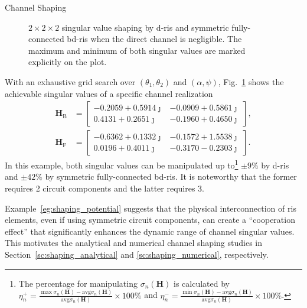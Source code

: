 \documentclass[journal]{IEEEtran}
\begin{document}
\begin{section}{Channel Shaping}
\begin{example}
\begin{figure}
			\caption{$2 \times 2 \times 2$ singular value shaping by \gls{d}-\gls{ris} and symmetric fully-connected \gls{bd}-\gls{ris} when the direct channel is negligible.
			The maximum and minimum of both singular values are marked explicitly on the plot.}
			\label{fg:shaping_potential}
		\end{figure}
		With an exhaustive grid search over $(\theta_1, \theta_2)$ and $(\alpha, \psi)$, Fig.~\ref{fg:shaping_potential} shows the achievable singular values of a specific channel realization
		\begin{equation*}
			\begin{split}
				\mathbf{H}_\mathrm{B} & =
				\begin{bmatrix}
					-0.2059 + 0.5914 \jmath & -0.0909 + 0.5861 \jmath \\
					0.4131 + 0.2651 \jmath  & -0.1960 + 0.4650 \jmath
				\end{bmatrix},
				\\
				\mathbf{H}_\mathrm{F} & =
				\begin{bmatrix}
					-0.6362 + 0.1332 \jmath & -0.1572 + 1.5538 \jmath \\
					0.0196 + 0.4011 \jmath  & -0.3170 - 0.2303 \jmath
				\end{bmatrix}.
			\end{split}
		\end{equation*}
		In this example, both singular values can be manipulated up to\footnote{The percentage for manipulating $\sigma_n(\mathbf{H})$ is calculated by $\eta_n^+ = \frac{\max \sigma_n(\mathbf{H}) - \mathrm{avg} \sigma_n(\mathbf{H})}{\mathrm{avg} \sigma_n(\mathbf{H})} \times 100\%$ and  $\eta_n^- = \frac{\min \sigma_n(\mathbf{H}) - \mathrm{avg} \sigma_n(\mathbf{H})}{\mathrm{avg} \sigma_n(\mathbf{H})} \times 100\%$.} $\pm 9\%$ by \gls{d}-\gls{ris} and $\pm 42\%$ by symmetric fully-connected \gls{bd}-\gls{ris}.
		It is noteworthy that the former requires 2 circuit components and the latter requires 3.
	\end{example}

	Example~\ref{eg:shaping_potential} suggests that the physical interconnection of \gls{ris} elements, even if using symmetric circuit components, can create a ``cooperation effect'' that significantly enhances the dynamic range of channel singular values.
	This motivates the analytical and numerical channel shaping studies in Section~\ref{sc:shaping_analytical} and \ref{sc:shaping_numerical}, respectively.


\end{section}
\end{document}
